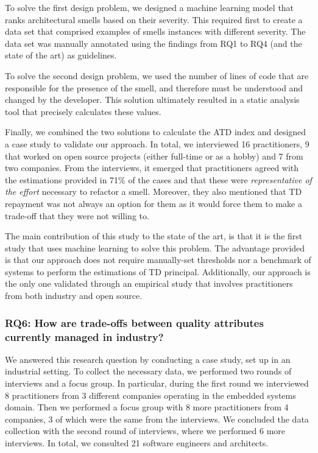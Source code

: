 To solve the first design problem, we designed a machine learning model that ranks architectural smells based on their severity. 
This required first to create a data set that comprised examples of smells instances with different severity. The data set was manually annotated using the findings from RQ1 to RQ4 (and the state of the art) as guidelines. 

To solve the second design problem, we used the number of lines of code that are responsible for the presence of the smell, and therefore must be understood and changed by the developer.
This solution ultimately resulted in a static analysis tool that precisely calculates these values.

Finally, we combined the two solutions to calculate the ATD index and designed a case study to validate our approach.
In total, we interviewed 16 practitioners, 9 that worked on open source projects (either full-time or as a hobby) and 7 from two companies.
From the interviews, it emerged that practitioners agreed with the estimations provided in 71\% of the cases and that these were \emph{representative of the effort} necessary to refactor a smell.
Moreover, they also mentioned that TD repayment was not always an option for them as it would force them to make a trade-off that they were not willing to.

The main contribution of this study to the state of the art, is that it is the first study that uses machine learning to solve this problem.
The advantage provided is that our approach does not require manually-set thresholds nor a benchmark of systems to perform the estimations of TD principal.
Additionally, our approach is the only one validated through an empirical study that involves practitioners from both industry and open source.

\subsubsection*{RQ6: How are trade-offs between quality attributes currently managed in industry?}
We answered this research question by conducting a case study, set up in an industrial setting.
To collect the necessary data, we performed two rounds of interviews and a focus group.
In particular, during the first round we interviewed 8 practitioners from 3 different companies operating in the embedded systems domain.
Then we performed a focus group with 8 more practitioners from 4 companies, 3 of which were the same from the interviews.
We concluded the data collection with the second round of interviews, where we performed 6 more interviews.
In total, we consulted 21 software engineers and architects.

